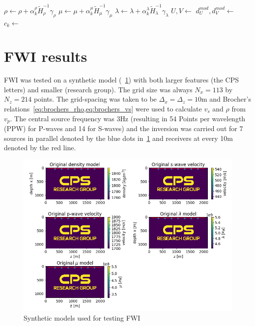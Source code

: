 \documentclass[10pt]{SelfArx} %
\theoremstyle{definition}
\begin{document}
\begin{algorithm}
\begin{algorithmic}[1]
            \State $\rho \gets \rho + \alpha^{\rho}_k \tilde{H}_{\rho}^{-1}\gamma_{\rho}$ 
            \State $\mu \gets \mu + \alpha^{\mu}_k \tilde{H}_{\mu}^{-1}\gamma_{\mu}$
            \State $\lambda \gets \lambda + \alpha^{\lambda}_k \tilde{H}_{\lambda}^{-1}\gamma_{\lambda}$
            \State $U, V \gets $  
            \State $d^{mod}_U, d^{mod}_V \gets $ 
            \State $c_k \gets $  
            \EndFor
        \EndWhile
    \EndIf

\EndFor
\end{algorithmic}
\end{algorithm}
\clearpage
\section{FWI results}
FWI was tested on a synthetic model (~\cref{fig:cps_model}) with both larger features (the CPS letters) and smaller (research group). The grid size was always $N_x = 113$ by $N_z=214$ points. The grid-spacing was taken to be $\Delta_x = \Delta_z = 10$m and Brocher's relations~\cref{eq:brochers_rho,eq:brochers_vs} were used to calculate $v_s$ and $\rho$ from $v_p$. The central source frequency was $3$Hz (resulting in 54 Points per wavelength (PPW) for P-waves and 14 for S-waves) and the inversion was carried out for 7 sources in parallel denoted by the blue dots in~\cref{fig:cps_model} and receivers at every 10m denoted by the red line.
\begin{figure}[!h]\label{fig:cps_model}
\hspace*{-0.4in}
\includegraphics[width=1.15\textwidth]{fig/cps_models2}
\caption{Synthetic models used for testing FWI}
\end{figure}
\end{document}
